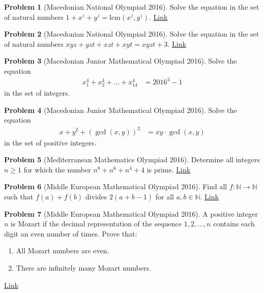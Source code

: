 \documentclass[]{article}
\theoremstyle{definition}
\newtheorem{problem}{Problem}
\begin{document}
\begin{problem}[Macedonian National Olympiad 2016]
	Solve the equation in the set of natural numbers $1+x^z + y^z = \text{lcm}(x^z,y^z)$. \hfill \href{http://artofproblemsolving.com/community/c6h1225106p6154392}{Link}
\end{problem}



\begin{problem}[Macedonian National Olympiad 2016]
	Solve the equation in the set of natural numbers $xyz+yzt+xzt+xyt = xyzt + 3$. \hfill \href{http://artofproblemsolving.com/community/c6h1225109p6154402}{Link}
\end{problem}



\begin{problem}[Macedonian Junior Mathematical Olympiad 2016]
	Solve the equation
		\begin{align*}
			x_1^4 + x_2^4 + \dots + x_{14}^4 &= 2016^3 -1
		\end{align*}
	in the set of integers.
\end{problem}



\begin{problem}[Macedonian Junior Mathematical Olympiad 2016]
	Solve the equation
		\begin{align*}
			x + y^2 + \left(\gcd(x,y)\right)^2 &= xy \cdot \gcd(x,y)
		\end{align*}
	in the set of positive integers.
\end{problem}



\begin{problem}[Mediterranean Mathematics Olympiad 2016]
	Determine all integers $n\ge1$ for which the number $n^8+n^6+n^4+4$ is prime. \hfill \href{http://artofproblemsolving.com/community/c6h1252007p6455074}{Link}
\end{problem}




\begin{problem}[Middle European Mathematical Olympiad 2016]
	Find all $f : \mathbb{N} \to \mathbb{N} $ such that $f(a) + f(b)$ divides $2(a + b - 1)$ for all $a, b \in \mathbb{N}$. \hfill \href{http://artofproblemsolving.com/community/c6h1295282p6869698}{Link}
\end{problem}





\begin{problem}[Middle European Mathematical Olympiad 2016]
	A positive integer $n$ is Mozart if the decimal representation of the sequence $1, 2, \ldots, n$ contains each digit an even number of times.
	Prove that:
		\begin{enumerate}
			\item All Mozart numbers are even.
			\item There are infinitely many Mozart numbers.
		\end{enumerate}
	\flushright \href{http://artofproblemsolving.com/community/c6h1295945p6876321}{Link}
\end{problem}
\end{document}
